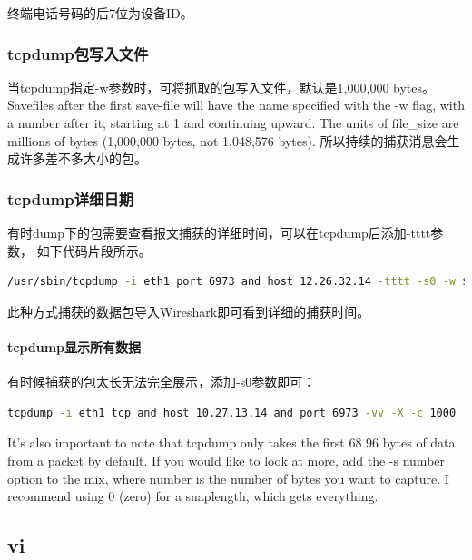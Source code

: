 \documentclass{book}
\begin{document}
终端电话号码的后7位为设备ID。

\subsubsection{tcpdump包写入文件}

当tcpdump指定-w参数时，可将抓取的包写入文件，默认是1,000,000 bytes。
Savefiles after the first  save-file  will  have  the name specified with the -w flag, 
with a number after it, starting at 1 and continuing upward.  
The units of file\_size are millions of bytes (1,000,000 bytes, not 1,048,576 bytes).
所以持续的捕获消息会生成许多差不多大小的包。

\subsubsection{tcpdump详细日期}

有时dump下的包需要查看报文捕获的详细时间，可以在tcpdump后添加-tttt参数，
如下代码片段所示。

\begin{lstlisting}[language=Bash]
/usr/sbin/tcpdump -i eth1 port 6973 and host 12.26.32.14 -tttt -s0 -w $packageStoreDir/$currentTime.cap
\end{lstlisting}

此种方式捕获的数据包导入Wireshark即可看到详细的捕获时间。

\paragraph{tcpdump显示所有数据}

有时候捕获的包太长无法完全展示，添加-s0参数即可：

\begin{lstlisting}[language=Bash]
tcpdump -i eth1 tcp and host 10.27.13.14 and port 6973 -vv -X -c 1000
\end{lstlisting}

It’s also important to note that tcpdump only takes the first 68 96 bytes of data from a packet by default. 
If you would like to look at more, add the -s number option to the mix, where number is the number of bytes you want to capture. 
I recommend using 0 (zero) for a snaplength, which gets everything. 


\subsection{vi}
\end{document}
